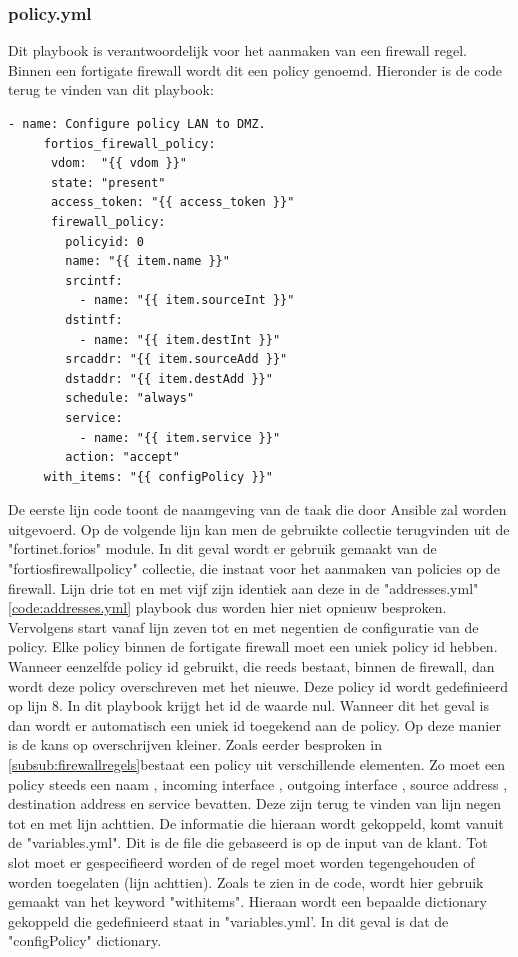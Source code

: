 \subsubsection{policy.yml}
\label{subsub:policy.yml}
Dit playbook is verantwoordelijk voor het aanmaken van een firewall regel. Binnen een fortigate firewall wordt dit een policy genoemd. Hieronder is de code terug te vinden van dit playbook: 
\begin{lstlisting}[caption={Playbook Policy}, label={lst:CodePolicy}]
     - name: Configure policy LAN to DMZ.
     fortios_firewall_policy:
      vdom:  "{{ vdom }}"
      state: "present"
      access_token: "{{ access_token }}"
      firewall_policy:
        policyid: 0
        name: "{{ item.name }}" 
        srcintf: 
          - name: "{{ item.sourceInt }}" 
        dstintf:
          - name: "{{ item.destInt }}"
        srcaddr: "{{ item.sourceAdd }}" 
        dstaddr: "{{ item.destAdd }}"
        schedule: "always"
        service:
          - name: "{{ item.service }}"
        action: "accept"
     with_items: "{{ configPolicy }}"
\end{lstlisting}

De eerste lijn code toont de naamgeving van de taak die door Ansible zal worden uitgevoerd. Op de volgende lijn kan men de gebruikte collectie terugvinden uit de "fortinet.forios" module. In dit geval wordt er gebruik gemaakt van de "fortios\textunderscore firewall\textunderscore policy" collectie, die instaat voor het aanmaken van policies op de firewall. Lijn drie tot en met vijf zijn identiek aan deze in de "addresses.yml" \ref{code:addresses.yml} playbook dus worden hier niet opnieuw besproken. Vervolgens start vanaf lijn zeven tot en met negentien de configuratie van de policy. Elke policy binnen de fortigate firewall moet een uniek policy id hebben. Wanneer eenzelfde policy id gebruikt, die reeds bestaat, binnen de firewall, dan wordt deze policy overschreven met het nieuwe. Deze policy id wordt gedefinieerd op lijn 8. In dit playbook krijgt het id de waarde nul. Wanneer dit het geval is dan wordt er automatisch een uniek id toegekend aan de policy. Op deze manier is de kans op overschrijven kleiner. Zoals eerder besproken in \ref{subsub:firewallregels}bestaat een policy uit verschillende elementen. Zo moet een policy steeds een naam , incoming interface , outgoing interface , source address , destination address en service bevatten. Deze zijn terug te vinden van lijn negen tot en met lijn achttien. De informatie die hieraan wordt gekoppeld, komt vanuit de "variables.yml". Dit is de file die gebaseerd is op de input van de klant. Tot slot moet er gespecifieerd worden of de regel moet worden tegengehouden of worden toegelaten (lijn achttien). Zoals te zien in de code, wordt hier gebruik gemaakt van het keyword "with\textunderscore items". Hieraan wordt een bepaalde dictionary gekoppeld die gedefinieerd staat in "variables.yml'.  In dit geval is dat de "configPolicy" dictionary. 

